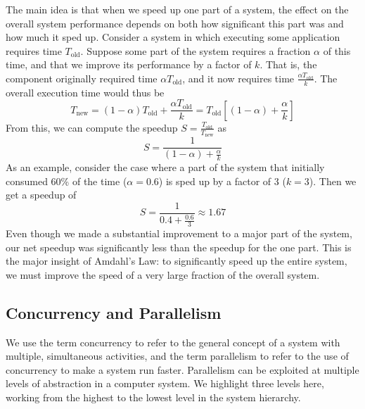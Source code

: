 \documentclass{article}
\begin{document}
The main idea is that when we speed up one part of a system, the effect on the overall system performance depends on both how significant this part was and how much it sped up. Consider a system in which executing some application requires time \( T_{\text{old}} \). Suppose some part of the system requires a fraction \( \alpha \) of this time, and that we improve its performance by a factor of \( k \). That is, the component originally required time \( \alpha T_{\text{old}} \), and it now requires time \( \frac{\alpha T_{\text{old}}}{k} \). The overall execution time would thus be
\[
T_{\text{new}} = (1 - \alpha) T_{\text{old}} + \frac{\alpha T_{\text{old}}}{k} = T_{\text{old}} \left[ (1 - \alpha) + \frac{\alpha}{k} \right]
\]
From this, we can compute the speedup \( S = \frac{T_{\text{old}}}{T_{\text{new}}} \) as
\[
S = \frac{1}{(1 - \alpha) + \frac{\alpha}{k}}
\]
As an example, consider the case where a part of the system that initially consumed 60\% of the time (\( \alpha = 0.6 \)) is sped up by a factor of 3 (\( k = 3 \)). Then we get a speedup of
\[
S = \frac{1}{0.4 + \frac{0.6}{3}} \approx 1.67
\]
Even though we made a substantial improvement to a major part of the system, our net speedup was significantly less than the speedup for the one part. This is the major insight of Amdahl's Law: to significantly speed up the entire system, we must improve the speed of a very large fraction of the overall system.

\subsection{Concurrency and Parallelism}

We use the term concurrency to refer to the general concept of a system with
multiple, simultaneous activities, and the term parallelism to refer to the use of
concurrency to make a system run faster. Parallelism can be exploited at multiple
levels of abstraction in a computer system. We highlight three levels here, working
from the highest to the lowest level in the system hierarchy.
\end{document}
